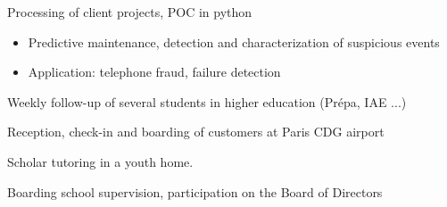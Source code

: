 \documentclass[10pt,a4paper]{fonteCVenglish}
\begin{document}
\divider

Processing of client projects, POC in python
\smallskip
\begin{itemize}
    \item Predictive maintenance, detection and characterization of suspicious events
    \item Application: telephone fraud, failure detection
\end{itemize}
\vspace{0.25cm}


   Weekly follow-up of several students in higher education (Prépa, IAE ...) 

\vspace{0.25cm}


   Reception, check-in and boarding of customers at Paris CDG airport

\vspace{0.25cm}

Scholar tutoring in a youth home.%

\vspace{0.25cm}

Boarding school supervision, participation on the Board of Directors
\end{document}
